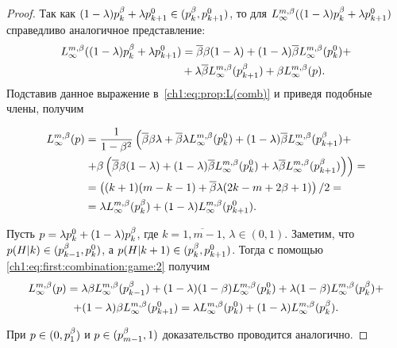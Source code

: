 {\begin{proof}
  Так как $(1-\lambda)\pOdd + \lambda \pEven[k+1] \in (\pOdd, \pEven[k+1])$, то для
  $\L*{\infty}( (1-\lambda)\pOdd + \lambda \pEven[k+1] )$ справедливо аналогичное представление:
  \begin{align*}
    \L*{\infty}( (1-\lambda)\pOdd + \lambda \pEven[k+1] ) 
    &=
    \DCo\Co(1-\lambda) +
    (1-\lambda)\DCo\L*{\infty}( \pEven ) + \\
    &+ \lambda\DCo\L*{\infty}( \pOdd[k+1] ) +
    \Co \L*{\infty}( p ).
  \end{align*}
  Подставив данное выражение в~\eqref{ch1:eq:prop:L(comb)} и приведя подобные члены, получим

  \begin{equation}
    \label{ch1:eq:first:combination:game:2}
    \begin{aligned}
      \L*{\infty}(p) 
      &= 
      \frac{1}{1-\Co^2}
      \left(
        \DCo\Co\lambda + 
        \DCo\lambda\L*{\infty}(\pEven) + 
        (1-\lambda)\DCo\L*{\infty}(\pOdd[k+1]) + 
      \right.\\
      &\left. 
        + \Co \left( 
          \DCo\Co(1-\lambda) +
          (1-\lambda)\DCo\L*{\infty}(\pEven) +
          \lambda\DCo\L*{\infty}(\pOdd[k+1]) 
        \right)
      \right) = \\
      &=
      \left( (k + 1)(m - k - 1) + \DCo\lambda(2k - m + 2\Co + 1)
      \right)/2 = \\
      &=
      \lambda\L*{\infty}(\pOdd) + (1-\lambda)\L*{\infty}(\pEven[k+1]).
    \end{aligned}
  \end{equation}
  
  Пусть $p = \lambda\pEven + (1-\lambda)\pOdd$, где $k = \overline{1, m - 1}, \, \lambda \in (0, 1)$.
  Заметим, что $\pac{H}{k} \in ( \pOdd[k-1], \pEven )$, а $\pac{H}{k+1} \in ( \pOdd, \pEven[k+1] )$.
  Тогда с помощью \eqref{ch1:eq:first:combination:game:2} получим
  \begin{multline*}
    \L*{\infty}(p) =
    \lambda \Co \L*{\infty}(\pOdd[k-1]) + 
    (1-\lambda)(1-\Co)\L*{\infty}(\pEven) + \lambda(1-\Co)\L*{\infty}(\pOdd) + \\
    + (1-\lambda)\Co\L*{\infty}(\pEven[k+1]) 
    = \lambda \L*{\infty}(\pEven) + (1-\lambda) \L*{\infty}(\pOdd).
  \end{multline*}
  
  При $p \in ( 0, \pOdd[1] )$ и $p \in ( \pOdd[m-1], 1 )$ доказательство проводится аналогично.
\end{proof}

}

